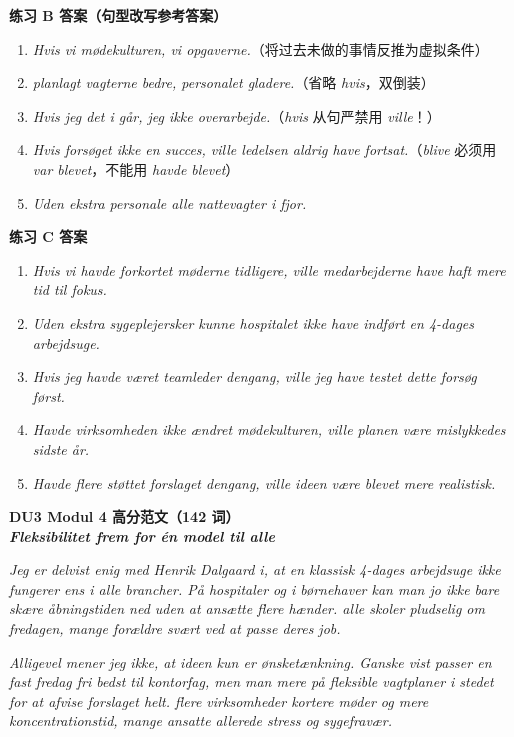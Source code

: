 \begin{answerbox}
\textbf{练习 B 答案（句型改写参考答案）}
\begin{enumerate}
  \item \textit{Hvis vi  mødekulturen,  vi  opgaverne.}（将过去未做的事情反推为虚拟条件）
  \item \textit{ planlagt vagterne bedre,  personalet  gladere.}（省略 \textit{hvis}，双倒装）
  \item \textit{Hvis jeg  det i går,  jeg ikke  overarbejde.}（\textit{hvis} 从句严禁用 \textit{ville}！）
  \item \textit{Hvis forsøget ikke  en succes, ville ledelsen aldrig have fortsat.}（\textit{blive} 必须用 \textit{var blevet}，不能用 \textit{havde blevet}）
  \item \textit{Uden ekstra personale  alle nattevagter i fjor.}
\end{enumerate}

\textbf{练习 C 答案}
\begin{enumerate}
  \item \textit{Hvis vi havde forkortet møderne tidligere, ville medarbejderne have haft mere tid til fokus.}
  \item \textit{Uden ekstra sygeplejersker kunne hospitalet ikke have indført en 4-dages arbejdsuge.}
  \item \textit{Hvis jeg havde været teamleder dengang, ville jeg have testet dette forsøg først.}
  \item \textit{Havde virksomheden ikke ændret mødekulturen, ville planen være mislykkedes sidste år.}
  \item \textit{Havde flere støttet forslaget dengang, ville ideen være blevet mere realistisk.}
\end{enumerate}

\textbf{DU3 Modul 4 高分范文（142 词）}\\
\textit{\textbf{Fleksibilitet frem for én model til alle}}

\textit{Jeg er delvist enig med Henrik Dalgaard i, at en klassisk 4-dages arbejdsuge ikke fungerer ens i alle brancher. På hospitaler og i børnehaver kan man jo ikke bare skære åbningstiden ned uden at ansætte flere hænder.  alle skoler pludselig  om fredagen,  mange forældre  svært ved at passe deres job.}

\textit{Alligevel mener jeg ikke, at ideen kun er ønsketænkning. Ganske vist passer en fast fredag fri bedst til kontorfag, men man  mere på fleksible vagtplaner i stedet for at afvise forslaget helt.  flere virksomheder  kortere møder og mere koncentrationstid,  mange ansatte allerede  stress og sygefravær.}


\end{answerbox}
